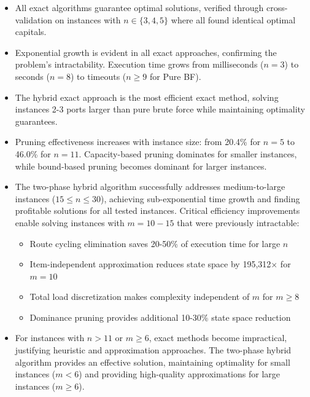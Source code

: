 \documentclass[12pt]{article}
\begin{document}
\begin{itemize}
    \item All exact algorithms guarantee optimal solutions, verified through cross-validation on instances with $n \in \{3, 4, 5\}$ where all found identical optimal capitals.
    
    \item Exponential growth is evident in all exact approaches, confirming the problem's intractability. Execution time grows from milliseconds ($n=3$) to seconds ($n=8$) to timeouts ($n \geq 9$ for Pure BF).
    
    \item The hybrid exact approach is the most efficient exact method, solving instances 2-3 ports larger than pure brute force while maintaining optimality guarantees.
    
    \item Pruning effectiveness increases with instance size: from 20.4\% for $n=5$ to 46.0\% for $n=11$. Capacity-based pruning dominates for smaller instances, while bound-based pruning becomes dominant for larger instances.
    
    \item The two-phase hybrid algorithm successfully addresses medium-to-large instances ($15 \leq n \leq 30$), achieving sub-exponential time growth and finding profitable solutions for all tested instances. Critical efficiency improvements enable solving instances with $m=10-15$ that were previously intractable:
    \begin{itemize}
        \item Route cycling elimination saves 20-50\% of execution time for large $n$
        \item Item-independent approximation reduces state space by 195,312$\times$ for $m=10$
        \item Total load discretization makes complexity independent of $m$ for $m \geq 8$
        \item Dominance pruning provides additional 10-30\% state space reduction
    \end{itemize}
    
    \item For instances with $n > 11$ or $m \geq 6$, exact methods become impractical, justifying heuristic and approximation approaches. The two-phase hybrid algorithm provides an effective solution, maintaining optimality for small instances ($m < 6$) and providing high-quality approximations for large instances ($m \geq 6$).
\end{itemize}
\end{document}
